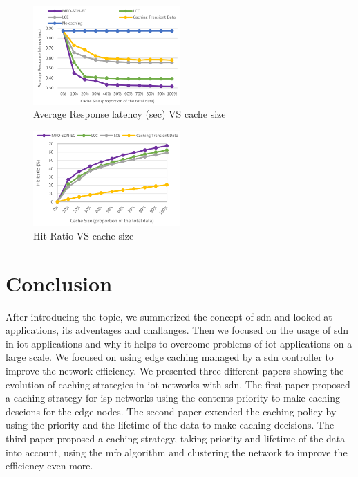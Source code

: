 \documentclass[conference]{IEEEtran}
\begin{document}
	\begin{figure}
		\centering
		\includegraphics[width=0.5\textwidth]{figures/latency-caching.png}
		\caption{Average Response latency (sec) VS cache size \cite{caching-1}}
		\label{fig:latency-caching}
	\end{figure}

	\begin{figure}
		\centering
		\includegraphics[width=0.5\textwidth]{figures/hitrate-caching.png}
		\caption{Hit Ratio VS cache size \cite{caching-1}}
		\label{fig:latency-caching}
	\end{figure}

	\section{Conclusion}
	\label{sec:conclusion}

	After introducing the topic, we summerized the concept of \ac{sdn} and looked at applications, its adventages and challanges. Then we focused on the usage of \ac{sdn} in \ac{iot} applications and why it helps to overcome problems of \ac{iot} applications on a large scale. We focused on using edge caching managed by a \ac{sdn} controller to improve the network efficiency. We presented three different papers showing the evolution of caching strategies in \ac{iot} networks with \ac{sdn}. The first paper \cite{caching-7} proposed a caching strategy for \ac{isp} networks using the contents priority to make caching descions for the edge nodes. The second paper \cite{caching-2} extended the caching policy by using the priority and the lifetime of the data to make caching decisions. The third paper \cite{caching-1} proposed a caching strategy, taking priority and lifetime of the data into account, using the \ac{mfo} algorithm and clustering the network to improve the efficiency even more.
\end{document}
